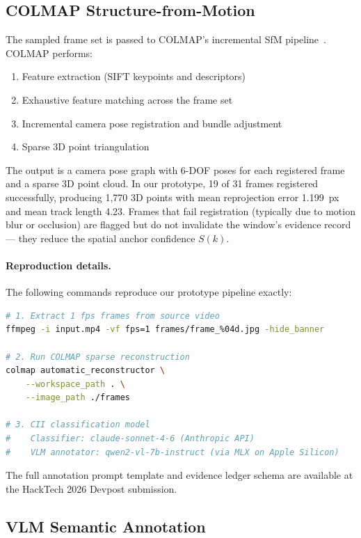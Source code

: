 \documentclass[sigconf,nonacm]{acmart}
\begin{document}
\subsection{COLMAP Structure-from-Motion}

The sampled frame set is passed to COLMAP's incremental SfM
pipeline~\cite{schonberger2016colmap}. COLMAP performs:
\begin{enumerate}[leftmargin=1.4em,itemsep=0.1em]
\item Feature extraction (SIFT keypoints and descriptors)
\item Exhaustive feature matching across the frame set
\item Incremental camera pose registration and bundle adjustment
\item Sparse 3D point triangulation
\end{enumerate}

The output is a camera pose graph with 6-DOF poses for each registered frame
and a sparse 3D point cloud. In our prototype, 19 of 31 frames registered
successfully, producing 1,770 3D points with mean reprojection error 1.199~px
and mean track length 4.23. Frames that fail registration (typically due to
motion blur or occlusion) are flagged but do not invalidate the window's
evidence record --- they reduce the spatial anchor confidence $S(k)$.

\paragraph{Reproduction details.}
The following commands reproduce our prototype pipeline exactly:

\begin{lstlisting}[language=bash,caption={Reproduction commands for VIMA prototype.}]
# 1. Extract 1 fps frames from source video
ffmpeg -i input.mp4 -vf fps=1 frames/frame_%04d.jpg -hide_banner

# 2. Run COLMAP sparse reconstruction
colmap automatic_reconstructor \
    --workspace_path . \
    --image_path ./frames

# 3. CII classification model
#    Classifier: claude-sonnet-4-6 (Anthropic API)
#    VLM annotator: qwen2-vl-7b-instruct (via MLX on Apple Silicon)
\end{lstlisting}

The full annotation prompt template and evidence ledger schema are available
at the HackTech 2026 Devpost submission.

\subsection{VLM Semantic Annotation}
\end{document}
